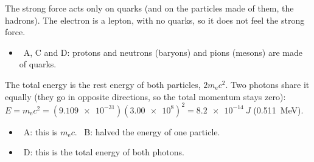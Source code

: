 \documentclass[12pt]{article}
\begin{document}
\begin{practiceanswers}
\begin{practiceans}
  The strong force acts only on quarks (and on the particles made of them, the hadrons). The electron is a
  lepton, with no quarks, so it does not feel the strong force.
  \begin{itemize}
    \item \xmark\ A, C and D: protons and neutrons (baryons) and pions (mesons) are made of quarks.
  \end{itemize}
\end{practiceans}

\begin{practiceans}
  The total energy is the rest energy of both particles, $2m_\mathrm{e}c^2$. Two photons share it
  equally (they go in opposite directions, so the total momentum stays zero):
  $E = m_\mathrm{e}c^2 = (\num{9.109e-31})(\num{3.00e8})^2 = \qty{8.2e-14}{J}$ (\qty{0.511}{MeV}).
  \begin{itemize}
    \item \xmark\ A: this is $m_\mathrm{e}c$. \quad \xmark\ B: halved the energy of one particle.
    \item \xmark\ D: this is the total energy of both photons.
  \end{itemize}
\end{practiceans}

\end{practiceanswers}
\end{document}
